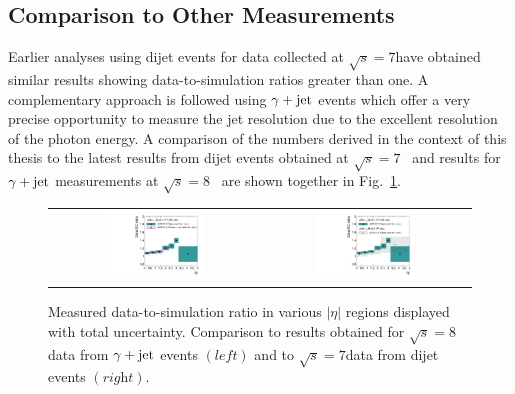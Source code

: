 \subsection{Comparison to Other Measurements}
\label{subsec:jer_results_comparison}
Earlier analyses using dijet events for data collected at $\sqrt{s}=7$\tev have obtained similar results showing data-to-simulation ratios greater than one. A complementary approach is followed using $\gamma +\rm{jet}$ events which offer a very precise opportunity to measure the jet resolution due to the excellent resolution of the photon energy. A comparison of the numbers derived in the context of this thesis to the latest results from dijet events obtained at $\sqrt{s}=7$\tev~\cite{thesis:Schroeder} and results for $\gamma +\rm{jet}$ measurements at $\sqrt{s}=8$\tev~\cite{CMS-AN-2013-179} are shown together in Fig.~\ref{fig:result_comparison}.
\begin{figure}[!t]
  \centering
  \begin{tabular}{cc}
                \includegraphics[width=0.49\textwidth]{figures/JER_2012_compPhoton_final_combination_v1.pdf} &
                \includegraphics[width=0.49\textwidth]{figures/JER_2012_comp2011_final_combination_v1.pdf}
  \end{tabular}
  \caption{Measured data-to-simulation ratio in various $|\eta|$ regions displayed with total uncertainty. Comparison to results obtained for $\sqrt{s}=8$\tev data from $\gamma +\rm{jet}$ events $(\textit{left})$ and to $\sqrt{s}=7$\tev data from dijet events $(\textit{right})$.}
  \label{fig:result_comparison}
\end{figure}
